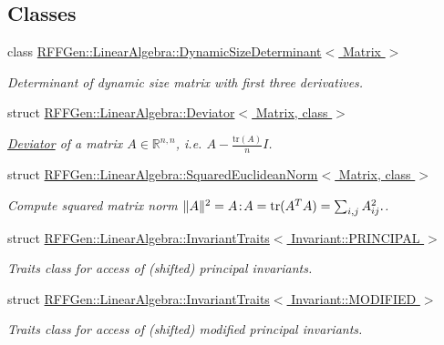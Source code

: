 \subsection*{Classes}
\begin{DoxyCompactItemize}
\item 
class \hyperlink{classRFFGen_1_1LinearAlgebra_1_1DynamicSizeDeterminant}{R\-F\-F\-Gen\-::\-Linear\-Algebra\-::\-Dynamic\-Size\-Determinant$<$ Matrix $>$}
\begin{DoxyCompactList}\small\item\em Determinant of dynamic size matrix with first three derivatives. \end{DoxyCompactList}\item 
struct \hyperlink{structRFFGen_1_1LinearAlgebra_1_1Deviator}{R\-F\-F\-Gen\-::\-Linear\-Algebra\-::\-Deviator$<$ Matrix, class $>$}
\begin{DoxyCompactList}\small\item\em \hyperlink{structRFFGen_1_1LinearAlgebra_1_1Deviator}{Deviator} of a matrix $ A\in\mathbb{R}^{n,n} $, i.\-e. $ A - \frac{\mathrm{tr}(A)}{n}I $. \end{DoxyCompactList}\item 
struct \hyperlink{structRFFGen_1_1LinearAlgebra_1_1SquaredEuclideanNorm}{R\-F\-F\-Gen\-::\-Linear\-Algebra\-::\-Squared\-Euclidean\-Norm$<$ Matrix, class $>$}
\begin{DoxyCompactList}\small\item\em Compute squared matrix norm $ \|A\|^2 = A\negthinspace : \negthinspace A = \mathrm{tr}(A^TA) = \sum_{i,j} A_{ij}^2. $. \end{DoxyCompactList}\item 
struct \hyperlink{structRFFGen_1_1LinearAlgebra_1_1InvariantTraits_3_01Invariant_1_1PRINCIPAL_01_4}{R\-F\-F\-Gen\-::\-Linear\-Algebra\-::\-Invariant\-Traits$<$ Invariant\-::\-P\-R\-I\-N\-C\-I\-P\-A\-L $>$}
\begin{DoxyCompactList}\small\item\em Traits class for access of (shifted) principal invariants. \end{DoxyCompactList}\item 
struct \hyperlink{structRFFGen_1_1LinearAlgebra_1_1InvariantTraits_3_01Invariant_1_1MODIFIED_01_4}{R\-F\-F\-Gen\-::\-Linear\-Algebra\-::\-Invariant\-Traits$<$ Invariant\-::\-M\-O\-D\-I\-F\-I\-E\-D $>$}
\begin{DoxyCompactList}\small\item\em Traits class for access of (shifted) modified principal invariants. \end{DoxyCompactList}\item 

\end{DoxyCompactItemize}
